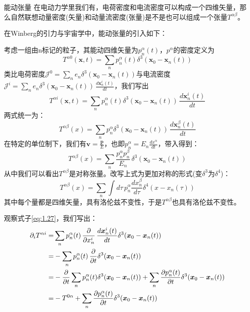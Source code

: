 \documentclass[../main.tex]{subfiles}
\begin{document}
\begin{definition}{能动张量}
    在电动力学里我们有，电荷密度和电流密度可以构成一个四维矢量，那么自然联想动量密度(矢量)和动量流密度(张量)是不是也可以组成一个张量$T^{\alpha \beta}$。

    在Winberg的引力与宇宙学中，能动张量的引入如下：

    考虑一组由n标记的粒子，其能动四维矢量为$p_{n}^{\alpha}(t)$，$p^{\alpha}$的密度定义为
    \begin{equation}
        T^{\alpha 0}(\bm{x},t) = \sum_{n} p_n^{\alpha}(t)\delta^3(\bm{x}_0 - \bm{x}_n(t)) 
    \end{equation}
    类比电荷密度$ \mathcal{J}^0 = \sum_{n} e_n \delta^3(\bm{x}_0 - \bm{x}_n(t)) $与电流密度$ \mathcal{J}^i = \sum_{n} e_n \delta^3(\bm{x}_0 - \bm{x}_n(t)) \,\frac{d\bm{x}^{i}_n(t)}{dt} $，我们写出
    \begin{equation}
        T^{\alpha i}(\bm{x},t) = \sum_{n} p_n^{\alpha}(t)\delta^3(\bm{x}_0 - \bm{x}_n(t)) \,\frac{d\bm{x}^{i}_n(t)}{dt} \label{eq:1.27}
    \end{equation}
    两式统一为：
    \begin{equation}
        T^{\alpha \beta}(x) = \sum_{n} p_n^{\alpha}\delta^3(\bm{x}_0 - \bm{x}_n(t)) \,\frac{d\bm{x}^{\beta}_n(t)}{dt}
    \end{equation}
    在特定的单位制下，我们有$\bm{v} = \frac{\bm{p}}{E}$，也即$ p_n^{\alpha} = E_n \frac{dx^{\alpha}}{dt} $，带入得到：
    \begin{equation}
        T^{\alpha \beta}(x) = \sum_{n} \frac{p^{\alpha}_n p^{\beta}_n}{E_n} \, \delta^3(\bm{x}_0 - \bm{x}_n(t))
    \end{equation}
    从中我们可以看出$T^{\alpha \beta}$是对称张量。改写上式为更加对称的形式(变$\delta^3$为$\delta^4$)：
    \begin{equation}
        T^{\alpha \beta}(x) = \sum_{n} \int d\tau \, p_n^{\alpha} \frac{dx_n^{\beta}}{d\tau} \delta^4(x - x_n(\tau))
    \end{equation}
    其中每个量都是四维矢量，具有洛伦兹不变性，于是$T^{\alpha \beta}$也具有洛伦兹不变性。
\end{definition}
    观察式子\eqref{eq:1.27}，我们写出：
    \begin{align}
        \partial_{i} T^{\alpha i} = & \sum_{n} p_n^{\alpha}(t)\, \frac{\partial}{\partial x_{n}^{i}}\,\frac{d\bm{x}^{i}_n(t)}{dt} \delta^3(\bm{x}_0 - \bm{x}_n(t)) \notag \\
                                  = & -\sum_{n} p_n^{\alpha}(t)\,\frac{\partial}{\partial t} \delta^3(\bm{x}_0 - \bm{x}_n(t)) \notag \\
                                  = & -\frac{\partial}{\partial t} \sum_{n} p_n^{\alpha}(t)\delta^3(\bm{x}_0 - \bm{x}_n(t)) + \sum_{n} \frac{\partial p_n^{\alpha}(t)}{\partial t}\delta^3(\bm{x}_0 - \bm{x}_n(t)) \notag \\
                                  = & -T^{0\alpha} + \sum_{n} \frac{\partial p_n^{\alpha}(t)}{\partial t}\delta^3(\bm{x}_0 - \bm{x}_n(t)) 
    \end{align}
\end{document}
